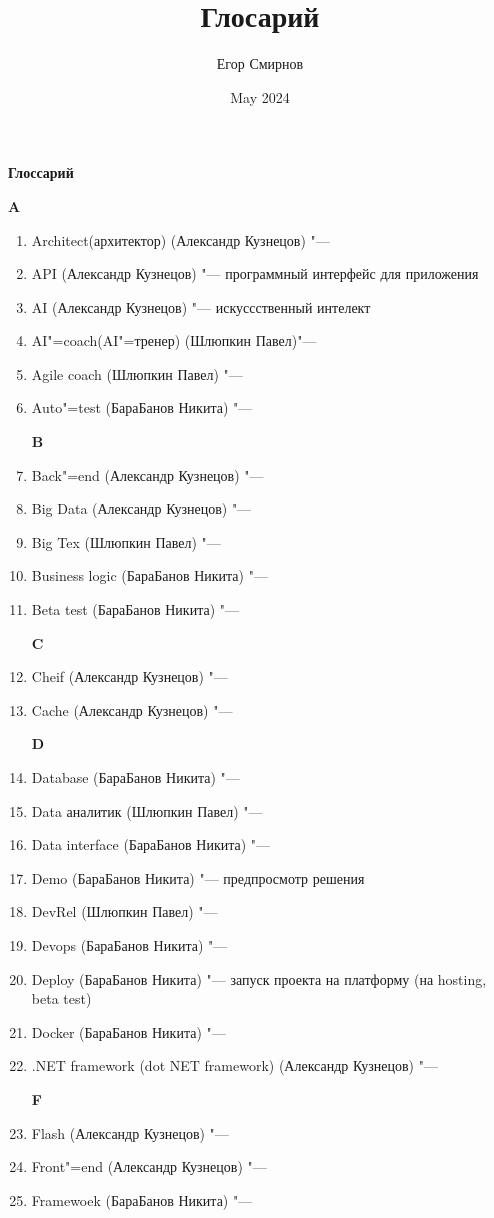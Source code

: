 \documentclass{article}
\title{Глосарий}
\author{Егор Смирнов}
\date{May 2024}
\begin{document}
\begin{center}
    \textbf{Глоссарий}
\end{center}
\textbf{A} 
\begin{enumerate}
    \item {Architect(архитектор) (Александр Кузнецов) "---}
    \item {API (Александр Кузнецов) "--- программный интерфейс для приложения}
    \item {AI (Александр Кузнецов) "--- искуссственный интелект}
    \item {AI"=coach(AI"=тренер) (Шлюпкин Павел)"---}
    \item {Agile coach (Шлюпкин Павел) "---}
    \item {Auto"=test (БараБанов Никита) "---}
    
    \textbf{B}
    \item {Back"=end (Александр Кузнецов) "---} 
    \item {Big Data (Александр Кузнецов) "---}
    \item {Big Tex (Шлюпкин Павел) "---}
    \item {Business logic (БараБанов Никита) "---}
    \item {Beta test (БараБанов Никита) "---}
    
    
    \textbf{C}
    \item {Cheif (Александр Кузнецов) "---}
    \item {Cache (Александр Кузнецов) "---}
    
    \textbf{D}
    \item {Database (БараБанов Никита) "---}
    \item {Data аналитик (Шлюпкин Павел) "--- }
    \item {Data interface (БараБанов Никита) "---}
    \item {Demo (БараБанов Никита) "--- предпросмотр решения}
    \item {DevRel (Шлюпкин Павел) "---}
    \item {Devops (БараБанов Никита) "---}
    \item {Deploy (БараБанов Никита) "--- запуск проекта на платформу (на hosting, beta test)}
    \item {Docker (БараБанов Никита) "---}
    \item{.NET framework (dot NET framework) (Александр Кузнецов) "---}
    

    \textbf{F}
    \item {Flash (Александр Кузнецов) "---}
    \item {Front"=end (Александр Кузнецов) "---}
    \item {Framewoek (БараБанов Никита) "---}


\end{enumerate}
\end{document}
